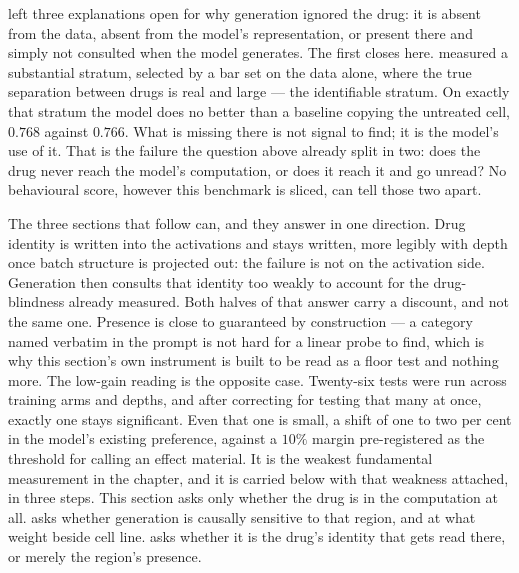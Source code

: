 \noindent
{} left three explanations open for why generation ignored the
drug: it is absent from the data, absent from the model's representation, or
present there and simply not consulted when the model generates. The first
closes here.  measured a substantial stratum, selected by a
bar set on the data alone, where the true separation between drugs is real and
large --- the identifiable stratum. On exactly that
stratum the model does no better than a baseline copying the untreated cell,
$0.768$ against $0.766$. What is missing there is not signal to find; it is the
model's use of it. That is the failure the question above already split in two:
does the drug never reach the model's computation, or does it reach it and go
unread? No behavioural score, however this benchmark is sliced, can tell those
two apart.

The three sections that follow can, and they answer in one direction. Drug
identity is written into the activations and stays written, more legibly with
depth once batch structure is projected out: the failure is not on the
activation side. Generation then consults that identity too weakly to account
for the drug-blindness already measured. Both halves of that answer carry a
discount, and not the same one. Presence is close to guaranteed by construction
--- a category named verbatim in the prompt is not hard for a linear probe to
find, which is why this section's own instrument is built to be read as a floor
test and nothing more. The low-gain reading is the opposite case. Twenty-six tests were run across
training arms and depths, and after correcting for testing that many at once,
exactly one stays significant. Even that one is small, a shift of one to two per
cent in the model's existing preference, against a $10\%$ margin pre-registered
as the threshold for calling an effect material. It is the weakest fundamental
measurement in the chapter, and it is carried below with that weakness attached, in three steps. This section asks only whether the drug is in
the computation at all.  asks whether generation is causally
sensitive to that region, and at what weight beside cell line. 
asks whether it is the drug's identity that gets read there, or merely the
region's presence.


